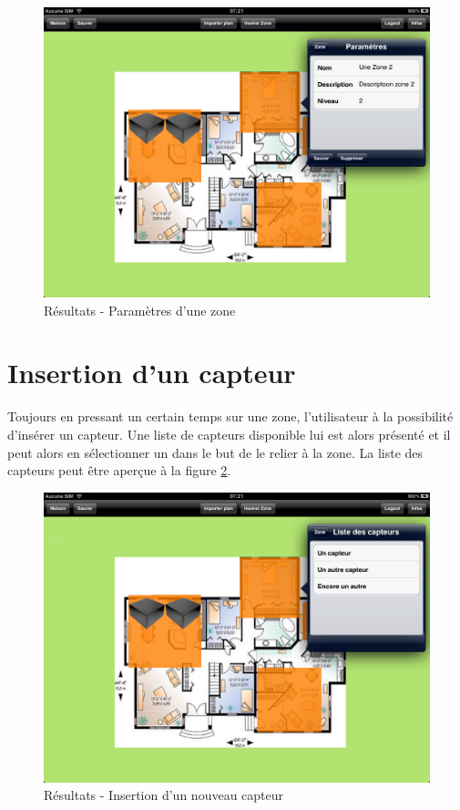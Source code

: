 \begin{figure}[H]
        \centering
        \includegraphics[width=\textwidth]{00_media/07_10.PNG}
        \caption{Résultats - Paramètres d'une zone}
        \label{gra:res10}
\end{figure}

\clearpage


\section{Insertion d'un capteur} %
\label{sub:insertion_d_un_capteur}

Toujours en pressant un certain temps sur une zone, l'utilisateur à la possibilité d'insérer un capteur. Une liste de capteurs disponible lui est alors présenté et il peut alors en sélectionner un dans le but de le relier à la zone. La liste des capteurs peut être aperçue à la figure \ref{gra:res11}.

\begin{figure}[H]
        \centering
        \includegraphics[width=\textwidth]{00_media/07_11.PNG}
        \caption{Résultats - Insertion d'un nouveau capteur}
        \label{gra:res11}
\end{figure}

